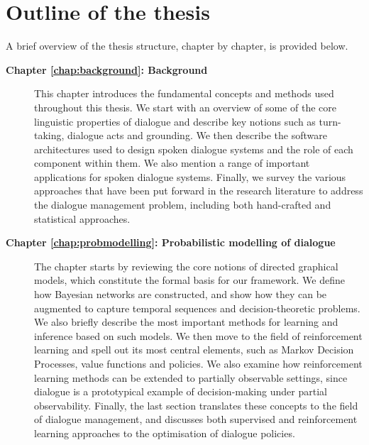 
\section{Outline of the thesis}

A brief overview of the thesis structure, chapter by chapter, is provided below. 

\begin{description}
  \item[\textbf{Chapter \ref{chap:background}: Background}] \hfill  \vspace{2mm}
  
This chapter introduces the fundamental concepts and methods used throughout this thesis. We start with an overview of some of the core linguistic properties of dialogue and describe key notions such as turn-taking, dialogue acts and grounding.  We then describe the software architectures used to design spoken dialogue systems and the role of each component within them.  We also mention a range of important applications for spoken dialogue systems. Finally, we survey the various approaches that have been put forward in the research literature to address the dialogue management problem, including both hand-crafted and statistical approaches. \vspace{2mm}

  \item[\textbf{Chapter \ref{chap:probmodelling}: Probabilistic modelling of dialogue}] \hfill \vspace{2mm}

 The chapter starts by reviewing the core notions of directed graphical models, which constitute the formal basis for our framework.  We define how Bayesian networks are constructed, and show how they can be augmented to capture temporal sequences and decision-theoretic problems. We also briefly describe the most important methods for learning and inference based on such models.  We then  move to the field of reinforcement learning and spell out its most central elements, such as Markov Decision Processes, value functions and policies. We also examine how reinforcement learning methods can be extended to partially observable settings, since dialogue is a prototypical example of decision-making under partial observability.  Finally, the last section translates these concepts to the field of dialogue management, and discusses both supervised and reinforcement learning approaches to the optimisation of dialogue policies.
 

\end{description}
